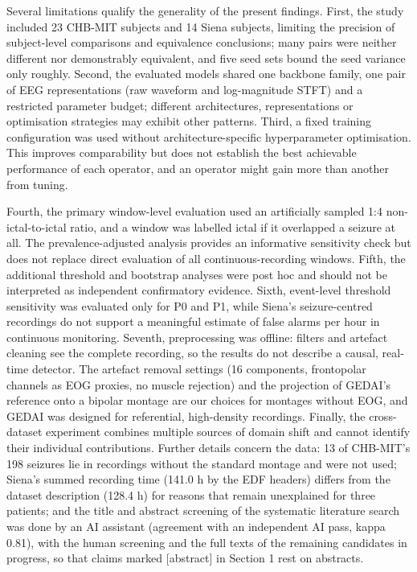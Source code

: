 \documentclass[11pt,a4paper]{article}
\begin{document}
\endgroup

Several limitations qualify the generality of the present findings. First, the study
included 23 CHB-MIT subjects and 14 Siena subjects, limiting the precision of
subject-level comparisons and equivalence conclusions; many pairs were neither different
nor demonstrably equivalent, and five seed sets bound the seed variance only roughly.
Second, the evaluated models shared one backbone family, one pair of EEG representations
(raw waveform and log-magnitude STFT) and a restricted parameter budget; different
architectures, representations or optimisation strategies may exhibit other patterns.
Third, a fixed training configuration was used without architecture-specific
hyperparameter optimisation. This improves comparability but does not establish the best
achievable performance of each operator, and an operator might gain more than another
from tuning.

Fourth, the primary window-level evaluation used an artificially sampled 1:4
non-ictal-to-ictal ratio, and a window was labelled ictal if it overlapped a seizure at
all. The prevalence-adjusted analysis provides an informative sensitivity check but does
not replace direct evaluation of all continuous-recording windows. Fifth, the additional
threshold and bootstrap analyses were post hoc and should not be interpreted as
independent confirmatory evidence. Sixth, event-level threshold sensitivity was
evaluated only for P0 and P1, while Siena's seizure-centred recordings do not support a
meaningful estimate of false alarms per hour in continuous monitoring. Seventh,
preprocessing was offline: filters and artefact cleaning see the complete recording, so
the results do not describe a causal, real-time detector. The artefact removal settings
(16 components, frontopolar channels as EOG proxies, no muscle rejection) and the
projection of GEDAI's reference onto a bipolar montage are our choices for montages
without EOG, and GEDAI was designed for referential, high-density recordings. Finally,
the cross-dataset experiment combines multiple sources of domain shift and cannot
identify their individual contributions. Further details concern the data: 13 of
CHB-MIT's 198 seizures lie in recordings without the standard montage and were not used;
Siena's summed recording time (141.0 h by the EDF headers) differs from the dataset
description (128.4 h) for reasons that remain unexplained for three patients; and the
title and abstract screening of the systematic literature search was done by an AI
assistant (agreement with an independent AI pass, kappa 0.81), with the human screening
and the full texts of the remaining candidates in progress, so that claims marked
{[}abstract{]} in Section 1 rest on abstracts.
\end{document}
